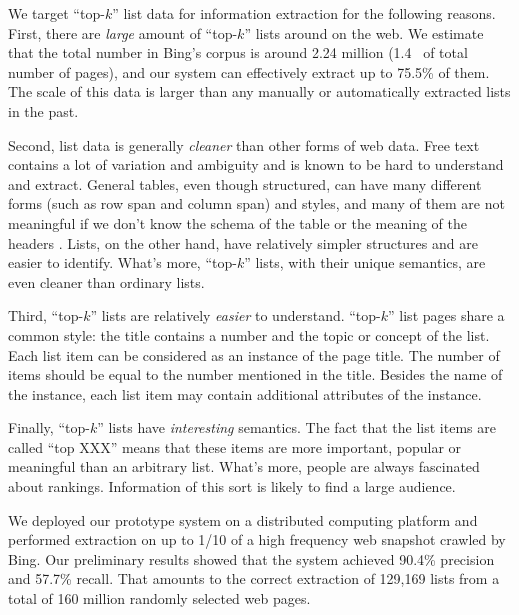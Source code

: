 We target ``top-$k$'' list data for information extraction 
for the following reasons.
First, there are {\em large} amount of ``top-$k$'' lists around on the web. 
We estimate that the total number in Bing's corpus is around 2.24 million 
(1.4\textperthousand~ of total number of pages), 
and our system can effectively extract up to 75.5\% of them. 
The scale of this data is larger than any manually or automatically 
extracted lists in the past.

Second, list data is generally {\em cleaner} than other forms of web data.
Free text contains a lot of variation and ambiguity and is known to be hard
to understand and extract. General tables, even though structured, 
can have many different forms (such as row span and column span) and styles, 
and many of them are not meaningful if we don't
know the schema of the table or the meaning of the headers 
\cite{WangWWZ12:Tables}.
Lists, on the other hand, have relatively simpler structures and are easier to
identify. What's more, ``top-$k$'' lists, with their unique semantics, are even
cleaner than ordinary lists.

Third, ``top-$k$'' lists are relatively {\em easier} to understand. 
``top-$k$'' list pages share a common style: 
the title contains a number and 
the topic or concept of the list. 
Each list item can be considered as an instance of the page title. 
The number of items should be equal to the number mentioned in the title.
Besides the name of the instance, each list item 
may contain additional attributes of the instance.

Finally, ``top-$k$'' lists have {\em interesting} semantics. 
The fact that the list items
are called ``top XXX'' means that these items are more important, popular or 
meaningful than an arbitrary list. What's more, people are always fascinated
about rankings. Information of this sort is likely to find a 
large audience.  

We deployed our prototype system on a distributed computing platform
and performed extraction on up to 1/10 of a high frequency web snapshot
crawled by Bing. Our preliminary results showed that the system achieved
90.4\% precision and 57.7\% recall. That amounts to the correct
extraction of 129,169 lists from a total of 160 million randomly selected 
web pages. 

